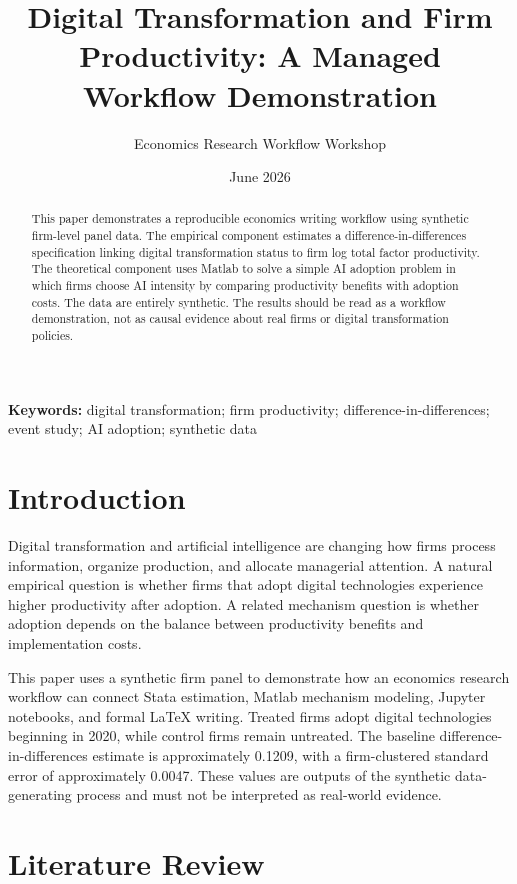 \documentclass[11pt]{article}
\title{Digital Transformation and Firm Productivity: A Managed Workflow Demonstration}
\author{Economics Research Workflow Workshop}
\date{June 2026}
\begin{document}
\maketitle

\begin{abstract}
This paper demonstrates a reproducible economics writing workflow using synthetic firm-level panel data. The empirical component estimates a difference-in-differences specification linking digital transformation status to firm log total factor productivity. The theoretical component uses Matlab to solve a simple AI adoption problem in which firms choose AI intensity by comparing productivity benefits with adoption costs. The data are entirely synthetic. The results should be read as a workflow demonstration, not as causal evidence about real firms or digital transformation policies.
\end{abstract}

\noindent\textbf{Keywords:} digital transformation; firm productivity; difference-in-differences; event study; AI adoption; synthetic data

\section{Introduction}

Digital transformation and artificial intelligence are changing how firms process information, organize production, and allocate managerial attention. A natural empirical question is whether firms that adopt digital technologies experience higher productivity after adoption. A related mechanism question is whether adoption depends on the balance between productivity benefits and implementation costs.

This paper uses a synthetic firm panel to demonstrate how an economics research workflow can connect Stata estimation, Matlab mechanism modeling, Jupyter notebooks, and formal \LaTeX{} writing. Treated firms adopt digital technologies beginning in 2020, while control firms remain untreated. The baseline difference-in-differences estimate is approximately 0.1209, with a firm-clustered standard error of approximately 0.0047. These values are outputs of the synthetic data-generating process and must not be interpreted as real-world evidence.

\section{Literature Review}
\end{document}
